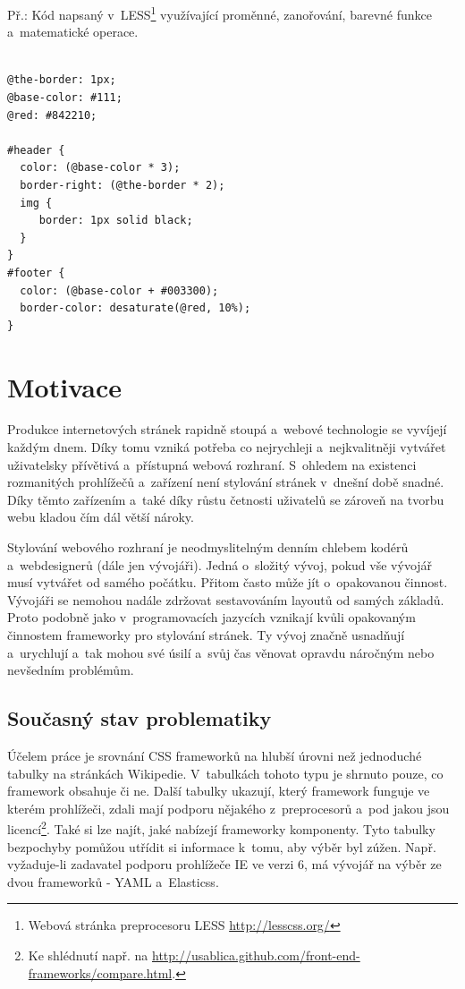 \documentclass[thesis=B,czech]{FITthesis}[2012/06/26]
\begin{document}
\noindent Př.: Kód napsaný v~LESS\footnote{Webová stránka preprocesoru LESS \url{http://lesscss.org/}} využívající proměnné, zanořování, barevné funkce a~matematické operace.
\scriptsize
\begin{verbatim}

@the-border: 1px;
@base-color: #111;
@red: #842210;

#header {
  color: (@base-color * 3);
  border-right: (@the-border * 2);
  img {
     border: 1px solid black;  
  }
}
#footer {
  color: (@base-color + #003300);
  border-color: desaturate(@red, 10%);
}
\end{verbatim}
\normalsize

\chapter{Motivace}
Produkce internetových stránek rapidně stoupá a~webové technologie se vyvíjejí každým dnem. Díky tomu vzniká potřeba co nejrychleji a~nejkvalitněji vytvářet uživatelsky přívětivá a~přístupná webová rozhraní. S~ohledem na existenci rozmanitých prohlížečů a~zařízení není stylování stránek v~dnešní době snadné. Díky těmto zařízením a~také díky růstu četnosti uživatelů se zároveň na tvorbu webu kladou čím dál větší nároky.

Stylování webového rozhraní je neodmyslitelným denním chlebem kodérů a~webdesignerů (dále jen vývojáři). Jedná o~složitý vývoj, pokud vše vývojář musí vytvářet od samého počátku. Přitom často může jít o~opakovanou činnost. Vývojáři se nemohou nadále zdržovat sestavováním layoutů od samých základů. Proto podobně jako v~programovacích jazycích vznikají kvůli opakovaným činnostem frameworky pro stylování stránek. Ty vývoj značně usnadňují a~urychlují a~tak mohou své úsilí a~svůj čas věnovat opravdu náročným nebo nevšedním problémům.


\section{Současný stav problematiky}

Účelem práce je srovnání \gls{CSS} frameworků na hlubší úrovni než jednoduché tabulky na stránkách Wikipedie. V~tabulkách tohoto typu je shrnuto pouze, co framework obsahuje či ne. Další tabulky ukazují, který framework funguje ve kterém prohlížeči, zdali mají podporu nějakého z~preprocesorů a~pod jakou jsou licencí\footnote{Ke shlédnutí např. na \url{http://usablica.github.com/front-end-frameworks/compare.html}.}. Také si lze najít, jaké nabízejí frameworky komponenty. Tyto tabulky bezpochyby pomůžou utřídit si informace k~tomu, aby výběr byl zúžen. Např. vyžaduje-li zadavatel podporu prohlížeče \gls{IE} ve verzi 6, má vývojář na výběr ze dvou frameworků - \gls{YAML} a~Elasticss.
\end{document}
